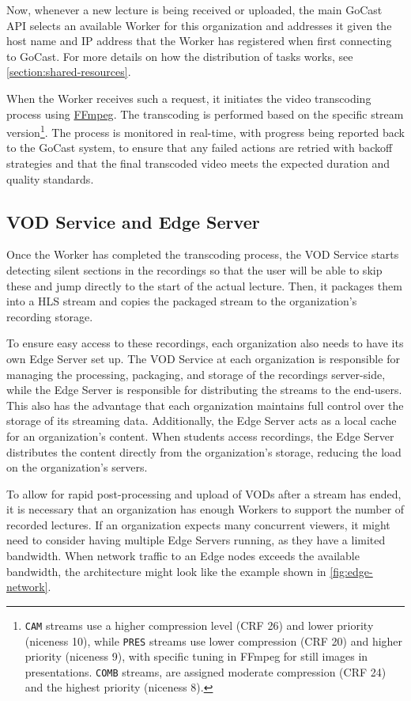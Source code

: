 Now, whenever a new lecture is being received or uploaded, the main GoCast \ac{API} selects an available Worker for this organization and addresses it given the host name and IP address that the Worker has registered when first connecting to GoCast. For more details on how the distribution of tasks works, see \autoref{section:shared-resources}.

When the Worker receives such a request, it initiates the video transcoding process using \href{https://ffmpeg.org/}{FFmpeg}. The transcoding is performed based on the specific stream version\footnote{\texttt{CAM} streams use a higher compression level (CRF 26) and lower priority (niceness 10), while \texttt{PRES} streams use lower compression (CRF 20) and higher priority (niceness 9), with specific tuning in FFmpeg for still images in presentations. \texttt{COMB} streams, are assigned moderate compression (CRF 24) and the highest priority (niceness 8).}. 
The process is monitored in real-time, with progress being reported back to the GoCast system, to ensure that any failed actions are retried with backoff strategies and that the final transcoded video meets the expected duration and quality standards.

\subsection{VOD Service and Edge Server}

Once the Worker has completed the transcoding process, the VOD Service starts detecting silent sections in the recordings so that the user will be able to skip these and jump directly to the start of the actual lecture. Then, it packages them into a \ac{HLS} stream and copies the packaged stream to the organization's recording storage.

To ensure easy access to these recordings, each organization also needs to have its own Edge Server set up. The VOD Service at each organization is responsible for managing the processing, packaging, and storage of the recordings server-side, while the Edge Server is responsible for distributing the streams to the end-users. This also has the advantage that each organization maintains full control over the storage of its streaming data.
Additionally, the Edge Server acts as a local cache for an organization's content. When students access recordings, the Edge Server distributes the content directly from the organization's storage, reducing the load on the organization's servers.

To allow for rapid post-processing and upload of \ac{VOD}s after a stream has ended, it is necessary that an organization has enough Workers to support the number of recorded lectures.
If an organization expects many concurrent viewers, it might need to consider having multiple Edge Servers running, as they have a limited bandwidth.
When network traffic to an Edge nodes exceeds the available bandwidth, the architecture might look like the example shown in \autoref{fig:edge-network}.

